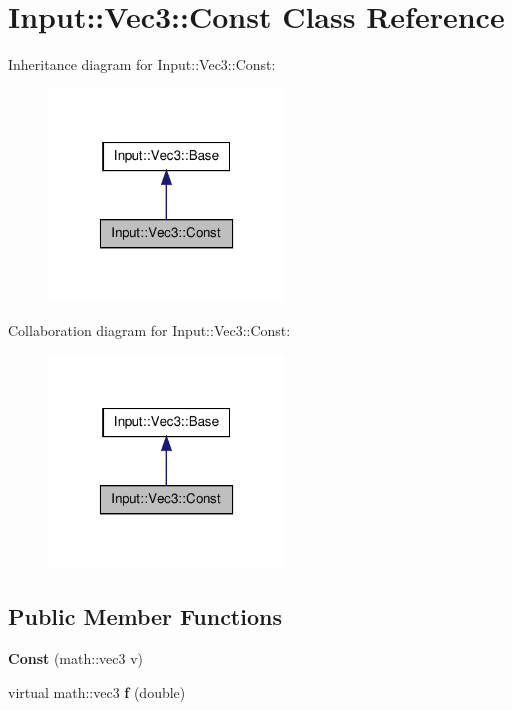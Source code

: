 \hypertarget{classInput_1_1Vec3_1_1Const}{\section{\-Input\-:\-:\-Vec3\-:\-:\-Const \-Class \-Reference}
\label{classInput_1_1Vec3_1_1Const}
}


\-Inheritance diagram for \-Input\-:\-:\-Vec3\-:\-:\-Const\-:\nopagebreak
\begin{figure}[H]
\begin{center}
\leavevmode
\includegraphics[width=178pt]{classInput_1_1Vec3_1_1Const__inherit__graph}
\end{center}
\end{figure}


\-Collaboration diagram for \-Input\-:\-:\-Vec3\-:\-:\-Const\-:\nopagebreak
\begin{figure}[H]
\begin{center}
\leavevmode
\includegraphics[width=178pt]{classInput_1_1Vec3_1_1Const__coll__graph}
\end{center}
\end{figure}
\subsection*{\-Public \-Member \-Functions}
\begin{DoxyCompactItemize}
\item 
\hypertarget{classInput_1_1Vec3_1_1Const_ac7ec7f1798a13524dac263d63660ee64}{{\bfseries \-Const} (math\-::vec3 v)}\label{classInput_1_1Vec3_1_1Const_ac7ec7f1798a13524dac263d63660ee64}

\item 
\hypertarget{classInput_1_1Vec3_1_1Const_ad2fdc41feb2afc22fbc7bda5fae71fba}{virtual math\-::vec3 {\bfseries f} (double)}\label{classInput_1_1Vec3_1_1Const_ad2fdc41feb2afc22fbc7bda5fae71fba}

\end{DoxyCompactItemize}
